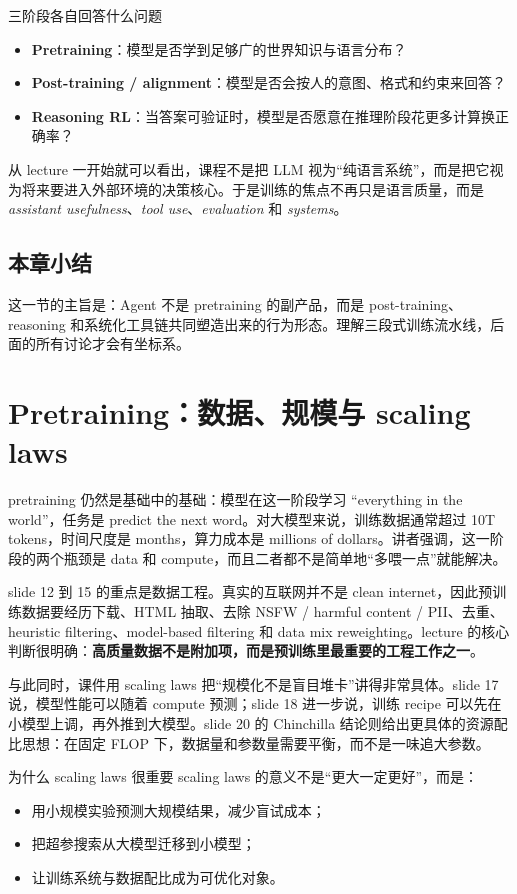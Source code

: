 \documentclass[a4paper]{article}
\begin{document}
\begin{knowledgebox}{三阶段各自回答什么问题}
\begin{itemize}
    \item \textbf{Pretraining}：模型是否学到足够广的世界知识与语言分布？
    \item \textbf{Post-training / alignment}：模型是否会按人的意图、格式和约束来回答？
    \item \textbf{Reasoning RL}：当答案可验证时，模型是否愿意在推理阶段花更多计算换正确率？
\end{itemize}
\end{knowledgebox}

从 lecture 一开始就可以看出，课程不是把 LLM 视为“纯语言系统”，而是把它视为将来要进入外部环境的决策核心。于是训练的焦点不再只是语言质量，而是 \emph{assistant usefulness}、\emph{tool use}、\emph{evaluation} 和 \emph{systems}。

\subsection{本章小结}
这一节的主旨是：Agent 不是 pretraining 的副产品，而是 post-training、reasoning 和系统化工具链共同塑造出来的行为形态。理解三段式训练流水线，后面的所有讨论才会有坐标系。

\section{Pretraining：数据、规模与 scaling laws}
pretraining 仍然是基础中的基础：模型在这一阶段学习 ``everything in the world''，任务是 predict the next word。对大模型来说，训练数据通常超过 10T tokens，时间尺度是 months，算力成本是 millions of dollars。讲者强调，这一阶段的两个瓶颈是 data 和 compute，而且二者都不是简单地“多喂一点”就能解决。

slide 12 到 15 的重点是数据工程。真实的互联网并不是 clean internet，因此预训练数据要经历下载、HTML 抽取、去除 NSFW / harmful content / PII、去重、heuristic filtering、model-based filtering 和 data mix reweighting。lecture 的核心判断很明确：\textbf{高质量数据不是附加项，而是预训练里最重要的工程工作之一}。

与此同时，课件用 scaling laws 把“规模化不是盲目堆卡”讲得非常具体。slide 17 说，模型性能可以随着 compute 预测；slide 18 进一步说，训练 recipe 可以先在小模型上调，再外推到大模型。slide 20 的 Chinchilla 结论则给出更具体的资源配比思想：在固定 FLOP 下，数据量和参数量需要平衡，而不是一味追大参数。

\begin{importantbox}{为什么 scaling laws 很重要}
scaling laws 的意义不是“更大一定更好”，而是：
\begin{itemize}
    \item 用小规模实验预测大规模结果，减少盲试成本；
    \item 把超参搜索从大模型迁移到小模型；
    \item 让训练系统与数据配比成为可优化对象。
\end{itemize}
\end{importantbox}
\end{document}
